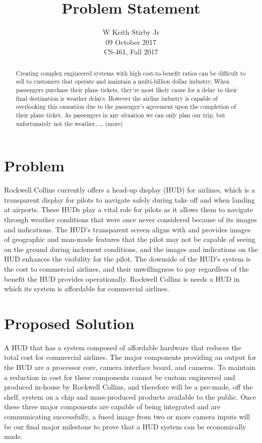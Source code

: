 \documentclass[letterpaper,10pt,serif,draftclsnofoot,onecolumn,compsoc,titlepage]{IEEEtran}
\title{Problem Statement}
\author{W Keith Stirby Jr \\ 09 October 2017 \\ CS-461, Fall 2017}
\begin{document}
\maketitle
\begin{abstract}

Creating complex engineered systems with high cost-to-benefit ratios can be difficult to sell to customers that operate and maintain a multi-billion dollar industry. When passengers purchase their plane tickets, they’re most likely cause for a delay to their final destination is weather delays. However the airline industry is capable of overlooking this causation due to the passenger’s agreement upon the completion of their plane ticket. As passengers in any situation we can only plan our trip, but unfortunately not the weather…… (more)\\

\end{abstract}

\section{Problem}

Rockwell Collins currently offers a head-up display (HUD) for airlines, which is a transparent display for pilots to navigate safely during take off and when landing at airports. These HUDs play a vital role for pilots as it allows them to navigate through weather conditions that were once never considered because of its images and indications. The HUD’s transparent screen aligns with and provides images of geographic and man-made features that the pilot may not be capable of seeing on the ground during inclement conditions, and the images and indications on the HUD enhances the visibility for the pilot. The downside of the HUD’s system is the cost to commercial airlines, and their unwillingness to pay regardless of the benefit the HUD provides operationally. Rockwell Collins is needs a HUD in which its system is affordable for commercial airlines.  \\

\section{Proposed Solution}

A HUD that has a system composed of affordable hardware that reduces the total cost for commercial airlines. The major components providing an output for the HUD are a processor core, camera interface board, and cameras. To maintain a reduction in cost for these components cannot be custom engineered and produced in-house by Rockwell Collins, and therefore will be a pre-made, off the shelf, system on a chip and mass-produced products available to the public. Once these three major components are capable of being integrated and are communicating successfully, a fused image from two or more camera inputs will be our final major milestone to prove that a HUD system can be economically made. \\
\end{document}
